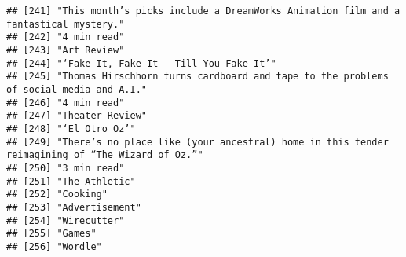 \documentclass[
]{article}
\begin{document}
\begin{verbatim}
## [241] "This month’s picks include a DreamWorks Animation film and a fantastical mystery."                                                                        
## [242] "4 min read"                                                                                                                                               
## [243] "Art Review"                                                                                                                                               
## [244] "‘Fake It, Fake It — Till You Fake It’"                                                                                                                    
## [245] "Thomas Hirschhorn turns cardboard and tape to the problems of social media and A.I."                                                                      
## [246] "4 min read"                                                                                                                                               
## [247] "Theater Review"                                                                                                                                           
## [248] "‘El Otro Oz’"                                                                                                                                             
## [249] "There’s no place like (your ancestral) home in this tender reimagining of “The Wizard of Oz.”"                                                            
## [250] "3 min read"                                                                                                                                               
## [251] "The Athletic"                                                                                                                                             
## [252] "Cooking"                                                                                                                                                  
## [253] "Advertisement"                                                                                                                                            
## [254] "Wirecutter"                                                                                                                                               
## [255] "Games"                                                                                                                                                    
## [256] "Wordle"                                                                                                                                                   

\end{verbatim}
\end{document}
